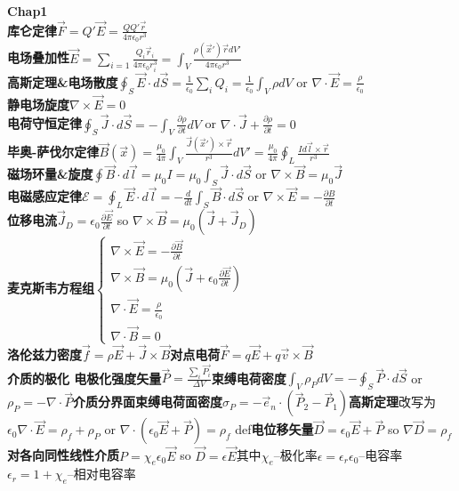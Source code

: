 \documentclass[10pt,a4paper]{article}
\begin{document}
\begin{multicols}{2}
\noindent\textbf{Chap1}\\
\textbf{库仑定律}$\vec{F}=Q'\vec{E}=\frac{QQ'\vec{r}}{4\pi\epsilon_0r^3}$\\
\textbf{电场叠加性}$\vec{E}=\sum_{i=1}\frac{Q_i\vec{r}_i}{4\pi\epsilon_0r_i^3}=\int_V\frac{\rho(\vec{x}')\vec{r}dV'}{4\pi\epsilon_0r^3}$\\
\textbf{高斯定理\&电场散度}$\oint_S\vec{E}\cdot d\vec{S}=\frac{1}{\epsilon_0}\sum_iQ_i=\frac{1}{\epsilon_0}\int_V\rho dV$ or $\nabla\cdot\vec{E}=\frac{\rho}{\epsilon_0}$\\
\textbf{静电场旋度}$\nabla\times\vec{E}=0$\\
\textbf{电荷守恒定律}$\oint_S\vec{J}\cdot d\vec{S}=-\int_V\frac{\partial\rho}{\partial t}dV$ or $\nabla\cdot\vec{J}+\frac{\partial\rho}{\partial t}=0$\\
\textbf{毕奥-萨伐尔定律}$\vec{B}(\vec{x})=\frac{\mu_0}{4\pi}\int_V\frac{\vec{J}(\vec{x}')\times \vec{r}}{r^3}dV'=\frac{\mu_0}{4\pi}\oint_L\frac{Id\vec{l}\times\vec{r}}{r^3}$\\
\textbf{磁场环量\&旋度}$\oint\vec{B}\cdot d\vec{l}=\mu_0I=\mu_0\int_S\vec{J}\cdot d\vec{S}$ or $\nabla\times\vec{B}=\mu_0\vec{J}$\\
\textbf{电磁感应定律}$\mathscr{E}=\oint_L\vec{E}\cdot d\vec{l}=-\frac{d}{dt}\int_S\vec{B}\cdot d\vec{S}$ or $\nabla\times\vec{E}=-\frac{\partial B}{\partial t}$\\
\textbf{位移电流}$\vec{J}_D=\epsilon_0\frac{\partial\vec{E}}{\partial t}$ so $\nabla\times\vec{B}=\mu_0(\vec{J}+\vec{J}_D)$\\
\textbf{麦克斯韦方程组}$\left\{\begin{array}{l}\nabla\times\vec{E}=-\frac{\partial\vec{B}}{\partial t}\\\nabla\times\vec{B}=\mu_0(\vec{J}+\epsilon_0\frac{\partial\vec{E}}{\partial t})\\\nabla\cdot\vec{E}=\frac{\rho}{\epsilon_0}\\
\nabla\cdot\vec{B}=0\end{array}\right.$\\
\textbf{洛伦兹力密度}$\vec{f}=\rho\vec{E}+\vec{J}\times\vec{B}$\textbf{对点电荷}$\vec{F}=q\vec{E}+q\vec{v}\times\vec{B}$\\
\textbf{介质的极化 电极化强度矢量}$\vec{P}=\frac{\sum_i\vec{P_i}}{\Delta V}$\textbf{束缚电荷密度}$\int_V\rho_PdV=-\oint_S\vec{P}\cdot d\vec{S}$ or $\rho_P=-\nabla\cdot\vec{P}$\textbf{介质分界面束缚电荷面密度}$\sigma_P=-\vec{e}_n\cdot(\vec{P}_2-\vec{P}_1)$\textbf{高斯定理}改写为$\epsilon_0\nabla\cdot\vec{E}=\rho_f+\rho_P$ or $\nabla\cdot(\epsilon_0\vec{E}+\vec{P})=\rho_f$ def\textbf{电位移矢量}$\vec{D}=\epsilon_0\vec{E}+\vec{P}$ so $\nabla\vec{D}=\rho_f$\textbf{对各向同性线性介质}$P=\chi_e\epsilon_0\vec{E}$ so $\vec{D}=\epsilon\vec{E}$其中$\chi_e$--极化率$\epsilon=\epsilon_r\epsilon_0$--电容率$\epsilon_r=1+\chi_e$--相对电容率\\

\end{multicols}
\end{document}

